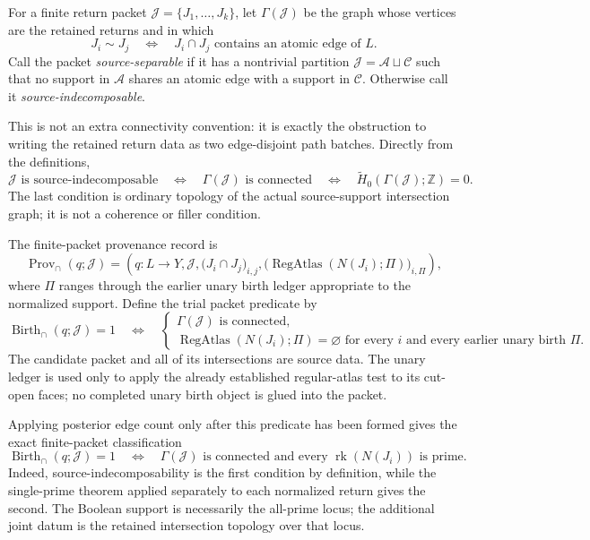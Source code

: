 \documentclass[11pt]{article}
\newcommand{\rk}{\operatorname{rk}}
\newcommand{\RegAtlas}{\operatorname{RegAtlas}}
\newcommand{\Birth}{\operatorname{Birth}}
\newcommand{\Prov}{\operatorname{Prov}}
\begin{document}
For a finite return packet
\(\mathcal J=\{J_1,\ldots,J_k\}\), let
\(\Gamma(\mathcal J)\) be the graph whose vertices are the retained returns and
in which
\[
J_i\sim J_j
\quad\Longleftrightarrow\quad
J_i\cap J_j\text{ contains an atomic edge of }L.
\]
Call the packet \emph{source-separable} if it has a nontrivial partition
\(\mathcal J=\mathcal A\sqcup\mathcal C\) such that no support in
\(\mathcal A\) shares an atomic edge with a support in \(\mathcal C\).
Otherwise call it \emph{source-indecomposable}.

This is not an extra connectivity convention: it is exactly the obstruction to
writing the retained return data as two edge-disjoint path batches.  Directly
from the definitions,
\[
\mathcal J\text{ is source-indecomposable}
\quad\Longleftrightarrow\quad
\Gamma(\mathcal J)\text{ is connected}
\quad\Longleftrightarrow\quad
\widetilde H_0(\Gamma(\mathcal J);\mathbb Z)=0.
\]
The last condition is ordinary topology of the actual source-support
intersection graph; it is not a coherence or filler condition.

The finite-packet provenance record is
\[
\Prov_{\cap}(q;\mathcal J)
=
\left(
q:L\to Y,
\mathcal J,
\bigl(J_i\cap J_j\bigr)_{i,j},
\bigl(\RegAtlas(N(J_i);\Pi)\bigr)_{i,\Pi}
\right),
\]
where \(\Pi\) ranges through the earlier unary birth ledger appropriate to the
normalized support.  Define the trial packet predicate by
\[
\boxed{
\Birth_{\cap}(q;\mathcal J)=1
\quad\Longleftrightarrow\quad
\begin{cases}
\Gamma(\mathcal J)\text{ is connected},\\
\RegAtlas(N(J_i);\Pi)=\varnothing
\text{ for every }i\text{ and every earlier unary birth }\Pi.
\end{cases}}
\]
The candidate packet and all of its intersections are source data.  The unary
ledger is used only to apply the already established regular-atlas test to its
cut-open faces; no completed unary birth object is glued into the packet.

Applying posterior edge count only after this predicate has been formed gives
the exact finite-packet classification
\[
\Birth_{\cap}(q;\mathcal J)=1
\quad\Longleftrightarrow\quad
\Gamma(\mathcal J)\text{ is connected and every }
\rk(N(J_i))\text{ is prime}.
\]
Indeed, source-indecomposability is the first condition by definition, while
the single-prime theorem applied separately to each normalized return gives the
second.  The Boolean support is necessarily the all-prime locus; the additional
joint datum is the retained intersection topology over that locus.
\end{document}
